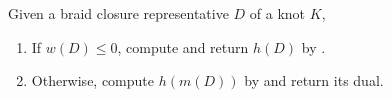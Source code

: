 \begin{algorithm}\label{algo:mirror}
    Given a braid closure representative $D$ of a knot $K$, \begin{enumerate}
        \item If $w(D) \leq 0$, compute and return $h(D)$ by .
        \item Otherwise, compute $h(m(D))$ by  and return its dual.
    \end{enumerate}
\end{algorithm}